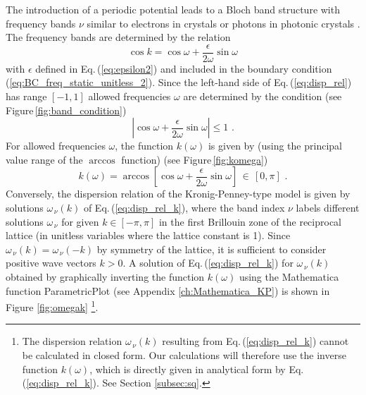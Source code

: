 The introduction of a periodic potential leads to a Bloch band structure 
with frequency bands $\nu$ similar to electrons in crystals
\cite{Ashcroft1976} or photons in photonic crystals \cite{Joannopoulos2008}.
The frequency bands are determined by the relation
%
\begin{equation}\label{eq:disp_rel}
    \cos{k} = \cos{\omega} + \frac{\epsilon}{2\omega}\sin{\omega}
\end{equation}
%
with $\epsilon$ defined in Eq.\,(\ref{eq:epsilon2}) and included in the boundary condition 
(\ref{eq:BC_freq_static_unitless_2}). 
Since the left-hand side of Eq.\,(\ref{eq:disp_rel}) has range $[-1,1]$ allowed frequencies 
$\omega$ are determined by the condition (see Figure\,\ref{fig:band_condition})
%
\begin{equation}\label{eq:bands_condition}
    \left|\cos{\omega} + \frac{\epsilon}{2\omega}\sin{\omega}\right| \leq 1 \, \, .
\end{equation}
%
For allowed frequencies $\omega$, the function $k(\omega)$ is given by
(using the principal value range of the $\arccos$ function) (see Figure\,\ref{fig:komega})
%
\begin{equation}\label{eq:disp_rel_k}
    k(\omega) = \arccos\left[ \cos{\omega} + \frac{\epsilon}{2\omega}\sin{\omega} \right] \, \in \, [0, \pi] \, \, .
\end{equation}
%
Conversely, the dispersion relation of the Kronig-Penney-type model is given by solutions 
$\omega_{\, \nu}(k)$ of Eq.\,(\ref{eq:disp_rel_k}), where the 
band index $\nu$ labels different solutions $\omega_{\, \nu}$ for given $k \in [-\pi, \pi]$
in the first Brillouin zone of the reciprocal lattice (in unitless variables where the lattice
constant is 1).
Since $\omega_{\, \nu}(k) = \omega_{\, \nu}(-k)$ by symmetry of the lattice, 
it is sufficient to consider positive wave vectors $k>0$. 
A solution 
of Eq.\,(\ref{eq:disp_rel_k}) for $\omega_{\, \nu}(k)$ obtained 
by graphically inverting the function $k(\omega)$ using the 
Mathematica function ParametricPlot (see Appendix \ref{ch:Mathematica_KP}) is shown in Figure \ref{fig:omegak}
%
\footnote{The dispersion relation $\omega_{\, \nu}(k)$ resulting from Eq.\,(\ref{eq:disp_rel_k}) cannot be 
calculated in closed form. Our calculations will therefore use the inverse function $k(\omega)$,
which is directly given in analytical form by Eq.\,(\ref{eq:disp_rel_k}). See Section \ref{subsec:sq}.}.

